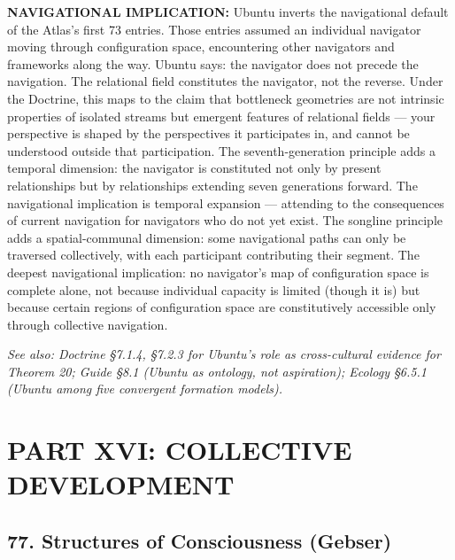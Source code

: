 \textbf{NAVIGATIONAL IMPLICATION:} Ubuntu inverts the navigational default of the Atlas's first 73 entries. Those entries assumed an individual navigator moving through configuration space, encountering other navigators and frameworks along the way. Ubuntu says: the navigator does not precede the navigation. The relational field constitutes the navigator, not the reverse. Under the Doctrine, this maps to the claim that bottleneck geometries are not intrinsic properties of isolated streams but emergent features of relational fields — your perspective is shaped by the perspectives it participates in, and cannot be understood outside that participation. The seventh-generation principle adds a temporal dimension: the navigator is constituted not only by present relationships but by relationships extending seven generations forward. The navigational implication is temporal expansion — attending to the consequences of current navigation for navigators who do not yet exist. The songline principle adds a spatial-communal dimension: some navigational paths can only be traversed collectively, with each participant contributing their segment. The deepest navigational implication: no navigator's map of configuration space is complete alone, not because individual capacity is limited (though it is) but because certain regions of configuration space are constitutively accessible only through collective navigation.


\textit{See also: Doctrine §7.1.4, §7.2.3 for Ubuntu's role as cross-cultural evidence for Theorem 20; Guide §8.1 (Ubuntu as ontology, not aspiration); Ecology §6.5.1 (Ubuntu among five convergent formation models).}


\bigskip\noindent\makebox[\textwidth]{\color{rulegray}\rule{5cm}{0.3pt}}\bigskip


\chapter*{PART XVI: COLLECTIVE DEVELOPMENT}


\section*{77. Structures of Consciousness (Gebser)}


